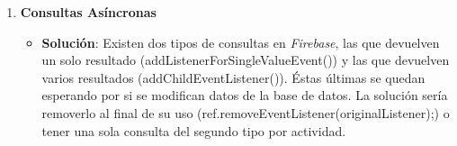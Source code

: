 \begin{enumerate}
		\item {\bf Consultas Asíncronas}
			\begin{itemize}
				\item {\bf Solución}: Existen dos tipos de consultas en {\it Firebase}, las que devuelven un solo resultado ({\ttfamily addListenerForSingleValueEvent()}) y las que devuelven varios resultados ({\ttfamily addChildEventListener()}). Éstas últimas se quedan esperando por si se modifican datos de la base de datos.
				La solución sería removerlo al final de su uso ({\ttfamily ref.removeEventListener(originalListener);}) o tener una sola consulta del segundo tipo por actividad.
			\end{itemize}
	\end{enumerate}